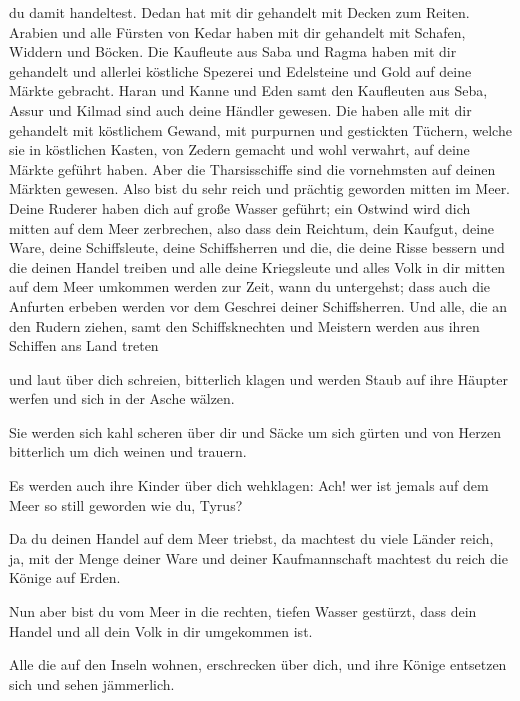du damit handeltest.  Dedan hat mit dir gehandelt mit
Decken zum Reiten.  Arabien und alle Fürsten von Kedar
haben mit dir gehandelt mit Schafen, Widdern und Böcken. 
Die Kaufleute aus Saba und Ragma haben mit dir gehandelt und allerlei
köstliche Spezerei und Edelsteine und Gold auf deine Märkte gebracht.
 Haran und Kanne und Eden samt den Kaufleuten aus Seba,
Assur und Kilmad sind auch deine Händler gewesen.  Die
haben alle mit dir gehandelt mit köstlichem Gewand, mit purpurnen und
gestickten Tüchern, welche sie in köstlichen Kasten, von Zedern gemacht
und wohl verwahrt, auf deine Märkte geführt haben.  Aber
die Tharsisschiffe sind die vornehmsten auf deinen Märkten gewesen. Also
bist du sehr reich und prächtig geworden mitten im Meer. 
Deine Ruderer haben dich auf große Wasser geführt; ein Ostwind wird dich
mitten auf dem Meer zerbrechen,  also dass dein Reichtum,
dein Kaufgut, deine Ware, deine Schiffsleute, deine Schiffsherren und
die, die deine Risse bessern und die deinen Handel treiben und alle
deine Kriegsleute und alles Volk in dir mitten auf dem Meer umkommen
werden zur Zeit, wann du untergehst;  dass auch die
Anfurten erbeben werden vor dem Geschrei deiner Schiffsherren.
 Und alle, die an den Rudern ziehen, samt den
Schiffsknechten und Meistern werden aus ihren Schiffen ans Land treten

 und laut über dich schreien, bitterlich klagen und
werden Staub auf ihre Häupter werfen und sich in der Asche wälzen.

 Sie werden sich kahl scheren über dir und Säcke um sich
gürten und von Herzen bitterlich um dich weinen und trauern.

 Es werden auch ihre Kinder über dich wehklagen: Ach! wer
ist jemals auf dem Meer so still geworden wie du, Tyrus?

 Da du deinen Handel auf dem Meer triebst, da machtest du
viele Länder reich, ja, mit der Menge deiner Ware und deiner
Kaufmannschaft machtest du reich die Könige auf Erden.

 Nun aber bist du vom Meer in die rechten, tiefen Wasser
gestürzt, dass dein Handel und all dein Volk in dir umgekommen ist.

 Alle die auf den Inseln wohnen, erschrecken über dich,
und ihre Könige entsetzen sich und sehen jämmerlich.

